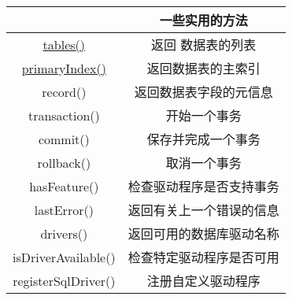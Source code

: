 \begin{tabular}{|c|c|}
	\hline	
		& 一些实用的方法\\
	\hline
	\href{https://github.com/QtDocumentCN/QtDocumentCN/blob/master/Src/S/QSqlDatabase/QSqlDatabase.md#qstringlist-qsqldatabasetablesqsqltabletype-type--qsqltables-const}{tables()} &	返回 数据表的列表\\
		\hline
	\href{URL}{primaryIndex()} &返回数据表的主索引\\
		\hline
	record()&	返回数据表字段的元信息\\
		\hline
	transaction()	&开始一个事务\\
		\hline
	commit()&	保存并完成一个事务\\
		\hline
	rollback()&	取消一个事务\\
		\hline
	hasFeature()&	检查驱动程序是否支持事务\\
		\hline
	lastError()	&返回有关上一个错误的信息\\
		\hline
	drivers()	&返回可用的数据库驱动名称\\
		\hline
	isDriverAvailable()	&检查特定驱动程序是否可用\\
		\hline
	registerSqlDriver()	&注册自定义驱动程序\\
		\hline
\end{tabular}

	
